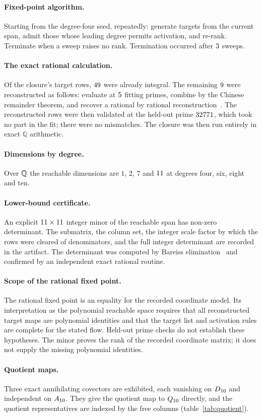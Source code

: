 \paragraph{Fixed-point algorithm.}
Starting from the degree-four seed, repeatedly: generate targets from the current
span, admit those whose leading degree permits activation, and re-rank. Terminate
when a sweep raises no rank. Termination occurred after $3$ sweeps.

\paragraph{The exact rational calculation.}
Of the closure's target rows, $49$ were already integral. The
remaining $9$ were reconstructed as follows: evaluate at
$5$ fitting primes, combine by the Chinese remainder theorem, and
recover a rational by rational reconstruction~\cite{Wang:1982}. The reconstructed
rows were then validated at the held-out prime $32771$, which took no
part in the fit; there were no mismatches. The closure was then run entirely in
exact $\mathbb{Q}$ arithmetic.

\paragraph{Dimensions by degree.}
Over $\mathbb{Q}$ the reachable dimensions are $1$, $2$, $7$ and $11$ at degrees
four, six, eight and ten.

\paragraph{Lower-bound certificate.}
An explicit $11 \times 11$ integer minor of the reachable
span has non-zero determinant. The submatrix, the column set, the integer scale
factor by which the rows were cleared of denominators, and the full integer
determinant are recorded in the artifact. The determinant was computed by Bareiss
elimination~\cite{Bareiss:1968} and confirmed by an independent exact rational
routine.

\paragraph{Scope of the rational fixed point.}
The rational fixed point is an equality for the recorded coordinate model.
Its interpretation as the polynomial reachable space requires that all
reconstructed target maps are polynomial identities and that the target list
and activation rules are complete for the stated flow. Held-out prime checks
do not establish these hypotheses. The minor proves the rank of the recorded
coordinate matrix; it does not supply the missing polynomial identities.

\paragraph{Quotient maps.}
Three exact annihilating covectors are exhibited, each vanishing on $D_{10}$ and
independent on $A_{10}$. They give the quotient map to $Q_{10}$ directly, and the
quotient representatives are indexed by the free columns
(table~\ref{tab:quotient}).
